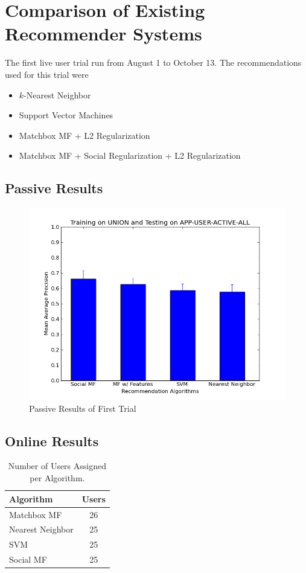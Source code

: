 \chapter{Comparison of Existing Recommender Systems}

The first live user trial run from August 1 to October 13. The recommendations used for this trial were 

\begin{itemize}
\item{$k$-Nearest Neighbor}
\item{Support Vector Machines}
\item{Matchbox MF  + L2 Regularization}
\item{Matchbox MF + Social Regularization + L2 Regularization}
\end{itemize}

\section {Passive Results}

\begin{figure}[h]
\centering
\includegraphics[scale=0.5]{Passive-First.png}
\caption{Passive Results of First Trial}
\end{figure}

\section{Online Results}

\begin{table}[h!]
\centering
\begin{tabular}{| l | c |}
\hline
{\bf Algorithm} & {\bf Users} \\
\hline
Matchbox MF & 26 \\
Nearest Neighbor & 25 \\
SVM & 25 \\
Social MF & 25\\
\hline
\end{tabular}
\caption{Number of Users Assigned per Algorithm.}
\end{table}

